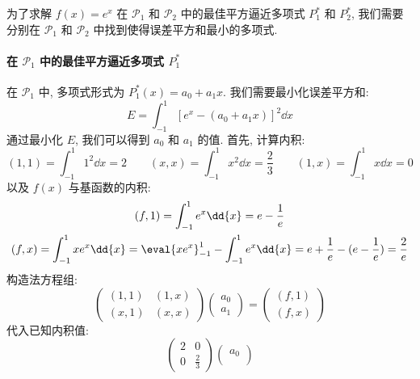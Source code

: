 \documentclass[lang = zh]{iwork}
\begin{document}
\begin{sol}
  为了求解 $f(x) = e^x$ 在 $\mathscr{P}_1$ 和 $\mathscr{P}_2$ 中的最佳平方逼近多项式 $P_1^*$ 和 $P_2^*$, 我们需要分别在 $\mathscr{P}_1$ 和 $\mathscr{P}_2$ 中找到使得误差平方和最小的多项式.

  \paragraph{在 $\mathscr{P}_1$ 中的最佳平方逼近多项式 $P_1^*$}
  在 $\mathscr{P}_1$ 中, 多项式形式为 $P_1^*(x) = a_0 + a_1 x$.
  我们需要最小化误差平方和:
  \begin{equation*}
    E = \int_{-1}^{1} [e^x - (a_0 + a_1 x)]^2 \dd{x}
  \end{equation*}
  通过最小化 $E$, 我们可以得到 $a_0$ 和 $a_1$ 的值.
  首先, 计算内积:
  \begin{equation*}
    (1, 1) = \int_{-1}^{1} 1^2 \dd{x} = 2           \qquad
    (x, x) = \int_{-1}^{1} x^2 \dd{x} = \frac{2}{3} \qquad
    (1, x) = \int_{-1}^{1} x \dd{x} = 0
  \end{equation*}
  以及 $f(x)$ 与基函数的内积:
  \begin{gather*}
    (f, 1) = \int_{-1}^{1} e^x \dd{x} = e - \frac{1}{e} \\
    (f, x) = \int_{-1}^{1} x e^x \dd{x} = \eval{x e^x}_{-1}^{1} - \int_{-1}^{1} e^x \dd{x} = e + \frac{1}{e} - (e - \frac{1}{e}) = \frac{2}{e}
  \end{gather*}
  构造法方程组:
  \begin{equation*}
    \begin{pmatrix}
      (1, 1) & (1, x) \\
      (x, 1) & (x, x)
    \end{pmatrix}
    \begin{pmatrix}
      a_0 \\
      a_1
    \end{pmatrix}
    =
    \begin{pmatrix}
      (f, 1) \\
      (f, x)
    \end{pmatrix}
  \end{equation*}
  代入已知内积值:
  \begin{equation*}
    \begin{pmatrix}
      2 & 0           \\
      0 & \frac{2}{3}
    \end{pmatrix}
    \begin{pmatrix}
      a_0 \\

\end{pmatrix}
\end{equation*}
\end{sol}
\end{document}

